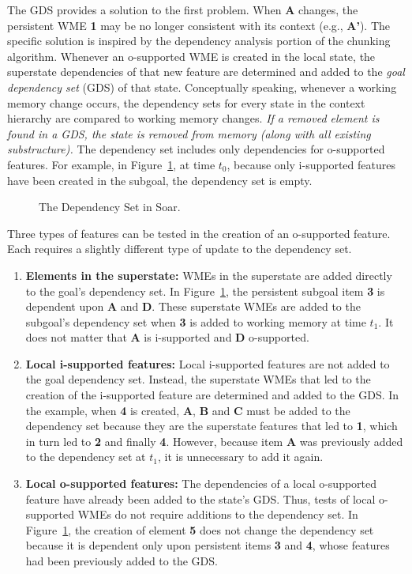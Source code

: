 The GDS provides a solution to the first problem. When {\bf A}
changes, the persistent WME {\bf 1} may be no longer consistent with
its context (e.g., {\bf A'}).  The specific solution is inspired by
the dependency analysis portion of the chunking algorithm. Whenever an o-supported WME is
created in the local state, the superstate dependencies of that new
feature are determined and added to the {\em goal dependency set}
(GDS) of that state. Conceptually speaking, whenever a working memory
change occurs, the dependency sets for every state in the context
hierarchy are compared to working memory changes. \textit{If a removed element 
is found in a GDS, the state is removed from memory (along with all existing
substructure).} The dependency set includes only dependencies for
o-supported features.  For example, in Figure~\ref{'gds'}, at time
$t_0$, because only i-supported features have been created in the
subgoal, the dependency set is empty.

\begin{figure}
	\caption{The Dependency Set in Soar.}
	\label{'gds'}
\end{figure}


Three types of features can be tested in the creation of an
o-supported feature.  Each requires a slightly different type of
update to the dependency set.\vspace{-10pt}
\begin{enumerate}
	\item \textbf{Elements in the superstate:} WMEs in the superstate are added
	directly to the goal's dependency set. In Figure~\ref{'gds'}, the
	persistent subgoal item {\bf 3} is dependent upon {\bf A} and {\bf
		D}. These superstate WMEs are added to the subgoal's dependency set when
	{\bf 3} is added to working memory at time $t_1$. It does not matter
	that {\bf A} is i-supported and {\bf D} o-supported.
	\item \textbf{Local i-supported features:} Local i-supported features are not
	added to the goal dependency set.  Instead, the superstate WMEs that
	led to the creation of the i-supported feature are determined and
	added to the GDS. In the example, when {\bf 4} is created, {\bf A},
	{\bf B} and {\bf C} must be added to the dependency set because they
	are the superstate features that led to {\bf 1}, which in turn led to
	{\bf 2} and finally {\bf 4}. However, because item {\bf A} was
	previously added to the dependency set at $t_1$, it is unnecessary to
	add it again.
	\item \textbf{Local o-supported features:} The dependencies of a local
	o-supported feature have already been added to the state's GDS. Thus,
	tests of local o-supported WMEs do not require additions to the
	dependency set. In Figure~\ref{'gds'}, the creation of element {\bf
		5} does not change the dependency set because it is dependent only
	upon persistent items {\bf 3} and {\bf 4}, whose features had been
	previously added to the GDS.
\end{enumerate}

